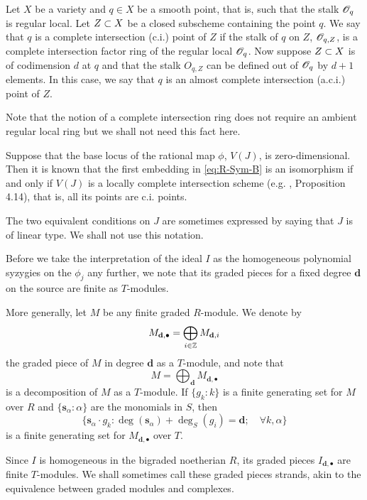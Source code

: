 \documentclass[fleqn,reqno]{amsart}
\numberwithin{first}{chapter}
\begin{document}
\begin{paragraf}
\label{par:ci-points}
Let $X$ be a variety and $q\in X$ be a smooth point, that is,
such that the stalk $\mathscr{O}_q$ is regular local.
Let $Z\subset X$ be a closed subscheme containing the point $q$.
We say that $q$ is a complete intersection (c.i.) point of $Z$
if the stalk of $q$ on $Z$, $\mathscr{O}_{q,Z}$,
is a complete intersection factor ring of the regular local $\mathscr{O}_q$.
Now suppose $Z\subset X$ is of codimension $d$ at $q$
and that the stalk $O_{q,Z}$ can be defined out of $\mathscr{O}_q$ by $d+1$ elements.
In this case, we say that $q$ is an almost complete intersection (a.c.i.)
point of $Z$.

Note that the notion of a complete intersection ring does not require
an ambient regular local ring but we shall not need this fact here.
\end{paragraf}

\begin{paragraf}
\label{par:linear-type}
Suppose that the base locus of the rational map $\phi$, $V(J)$, is zero-dimensional.
Then it is known that the first embedding in \eqref{eq:R-Sym-B} is an isomorphism
if and only if $V(J)$ is a locally complete intersection scheme (e.g. \citet{BJ-JA-03}, Proposition 4.14),
that is, all its points are c.i. points.

The two equivalent conditions on $J$ are sometimes expressed by saying that
$J$ is of linear type. We shall not use this notation.
\end{paragraf}

\begin{paragraf}
\label{par:finite-strand}
Before we take the interpretation of the ideal $I$ as
the homogeneous polynomial syzygies on the $\phi_j$ any further,
we note that its graded pieces for a fixed degree $\mathbf d$ on the source
are finite as $T$-modules.

More generally, let $M$ be any finite graded $R$-module.
We denote by
\[
M_{\mathbf d,\bullet}=\bigoplus_{i\in\mathbb{Z}} M_{\mathbf d,i}
\]
the graded piece of $M$ in degree $\mathbf d$ as a $T$-module, and note that
\[
M=\bigoplus_{\mathbf d} M_{\mathbf d,\bullet}
\]
is a decomposition of $M$ as a $T$-module.
If $\{g_k:k\}$ is a finite generating set for $M$ over $R$ and
$\{\mathbf s_\alpha:\alpha\}$ are the monomials in $S$, then
\[
\{\mathbf s_\alpha\cdot g_k: \deg(\mathbf s_\alpha)+\deg_S(g_i)={\mathbf d};\quad\forall k, \alpha\}
\]
is a finite generating set for $M_{\mathbf d,\bullet}$ over $T$.

Since $I$ is homogeneous in the bigraded noetherian $R$,
its graded pieces $I_{\mathbf d,\bullet}$ are finite $T$-modules.
We shall sometimes call these graded pieces strands, akin to the equivalence between graded modules
and complexes.
\end{paragraf}
\end{document}
